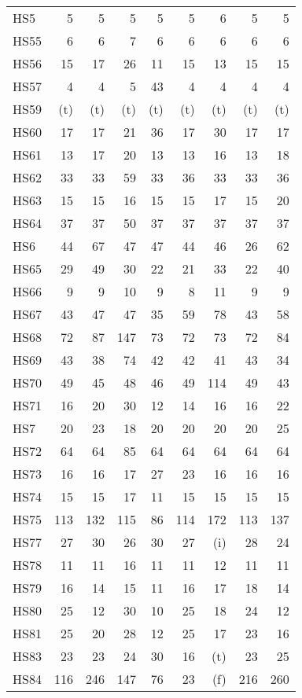 \documentclass[11pt,twoside]{article}
\begin{document}
{\begin{longtable}[c]{|l|r|r|r|r|r|r|r|r|}
 HS5 & 5 & 5 & 5 & 5 & 5 & 6 & 5 & 5 \\
 HS55 & 6 & 6 & 7 & 6 & 6 & 6 & 6 & 6 \\
 HS56 & 15 & 17 & 26 & 11 & 15 & 13 & 15 & 15 \\
 HS57 & 4 & 4 & 5 & 43 & 4 & 4 & 4 & 4 \\
 HS59 & (t) & (t) & (t) & (t) & (t) & (t) & (t) & (t) \\
 HS60 & 17 & 17 & 21 & 36 & 17 & 30 & 17 & 17 \\
 HS61 & 13 & 17 & 20 & 13 & 13 & 16 & 13 & 18 \\
 HS62 & 33 & 33 & 59 & 33 & 36 & 33 & 33 & 36 \\
 HS63 & 15 & 15 & 16 & 15 & 15 & 17 & 15 & 20 \\
 HS64 & 37 & 37 & 50 & 37 & 37 & 37 & 37 & 37 \\
 HS6 & 44 & 67 & 47 & 47 & 44 & 46 & 26 & 62 \\
 HS65 & 29 & 49 & 30 & 22 & 21 & 33 & 22 & 40 \\
 HS66 & 9 & 9 & 10 & 9 & 8 & 11 & 9 & 9 \\
 HS67 & 43 & 47 & 47 & 35 & 59 & 78 & 43 & 58 \\
 HS68 & 72 & 87 & 147 & 73 & 72 & 73 & 72 & 84 \\
 HS69 & 43 & 38 & 74 & 42 & 42 & 41 & 43 & 34 \\
 HS70 & 49 & 45 & 48 & 46 & 49 & 114 & 49 & 43 \\
 HS71 & 16 & 20 & 30 & 12 & 14 & 16 & 16 & 22 \\
 HS7 & 20 & 23 & 18 & 20 & 20 & 20 & 20 & 25 \\
 HS72 & 64 & 64 & 85 & 64 & 64 & 64 & 64 & 64 \\
 HS73 & 16 & 16 & 17 & 27 & 23 & 16 & 16 & 16 \\
 HS74 & 15 & 15 & 17 & 11 & 15 & 15 & 15 & 15 \\
 HS75 & 113 & 132 & 115 & 86 & 114 & 172 & 113 & 137 \\
 HS77 & 27 & 30 & 26 & 30 & 27 & (i) & 28 & 24 \\
 HS78 & 11 & 11 & 16 & 11 & 11 & 12 & 11 & 11 \\
 HS79 & 16 & 14 & 15 & 11 & 16 & 17 & 18 & 14 \\
 HS80 & 25 & 12 & 30 & 10 & 25 & 18 & 24 & 12 \\
 HS81 & 25 & 20 & 28 & 12 & 25 & 17 & 23 & 16 \\
 HS83 & 23 & 23 & 24 & 30 & 16 & (t) & 23 & 25 \\
 HS84 & 116 & 246 & 147 & 76 & 23 & (f) & 216 & 260 \\

\end{longtable}}
\end{document}
